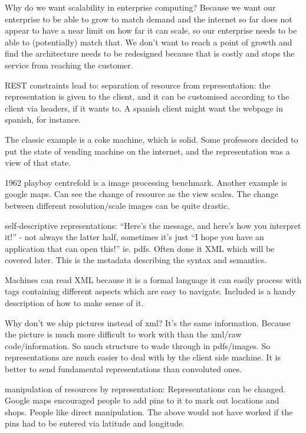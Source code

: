 \documentclass[11pt]{article}
\begin{document}
Why do we want scalability in enterprise computing? Because we want our enterprise to be able to grow to match demand and the internet so far does not appear to have a near limit on how far it can scale, so our enterprise needs to be able to (potentially) match that. We don’t want to reach a point of growth and find the architecture needs to be redesigned because that is costly and stops the service from reaching the customer.

REST constraints lead to:
separation of resource from representation: the representation is given to the client, and it can be customised according to the client via headers, if it wants to. A spanish client might want the webpage in spanish, for instance.

The classic example is a coke machine, which is solid. Some professors decided to put the state of vending machine on the internet, and the representation was a view of that state.

1962 playboy centrefold is a image processing benchmark. Another example is google maps. Can see the change of resource as the view scales. The change between different resolution/scale images can be quite drastic.

self-descriptive representations: “Here’s the message, and here’s how you interpret it!” - not always the latter half, sometimes it’s just “I hope you have an application that can open this!” ie. pdfs. Often done it XML which will be covered later. This is the metadata describing the syntax and semantics. 

Machines can read XML because it is a formal language it can easily process with tags containing different aspects which are easy to navigate. Included is a handy description of how to make sense of it.

Why don’t we ship pictures instead of xml? It’s the same information. Because the picture is much more difficult to work with than the xml/raw code/information. So much structure to wade through in pdfs/images. So representations are much easier to deal with by the client side machine. It is better to send fundamental representations than convoluted ones.

manipulation of resources by representation: Representations can be changed. Google maps encouraged people to add pins to it to mark out locations and shops. People like direct manipulation. The above would not have worked if the pins had to be entered via latitude and longitude.
\end{document}
